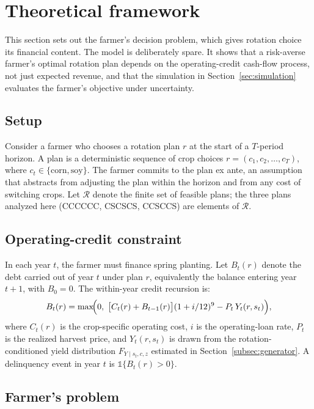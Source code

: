 \documentclass[11pt,letterpaper]{article}
\theoremstyle{remark}
\begin{document}
\section{\label{sec:theory}Theoretical framework}
 
This section sets out the farmer's decision problem, which gives rotation choice its financial content. The model is deliberately spare. It shows that a risk-averse farmer's optimal rotation plan depends on the operating-credit cash-flow process, not just expected revenue, and that the simulation in Section~\ref{sec:simulation} evaluates the farmer's objective under uncertainty.
 
\subsection{\label{subsec:setup}Setup}
 
Consider a farmer who chooses a rotation plan $r$ at the start of a $T$-period horizon. A plan is a deterministic sequence of crop choices $r = (c_1, c_2, \ldots, c_T)$, where $c_t \in \{\text{corn}, \text{soy}\}$. The farmer commits to the plan ex ante, an assumption that abstracts from adjusting the plan within the horizon and from any cost of switching crops. Let $\mathcal{R}$ denote the finite set of feasible plans; the three plans analyzed here (CCCCCC, CSCSCS, CCSCCS) are elements of $\mathcal{R}$.
 
\subsection{\label{subsec:constraint}Operating-credit constraint}
 
In each year $t$, the farmer must finance spring planting. Let $B_t(r)$ denote the debt carried out of year $t$ under plan $r$, equivalently the balance entering year $t+1$, with $B_0 = 0$. The within-year credit recursion is:
\begin{equation}
B_t(r) = \max\!\Bigl(0,\;\bigl[C_t(r) + B_{t-1}(r)\bigr](1+i/12)^{9}
- P_t\,Y_t(r, s_t)\Bigr),
\end{equation}
where $C_t(r)$ is the crop-specific operating cost, $i$ is the operating-loan rate, $P_t$ is the realized harvest price, and $Y_t(r, s_t)$ is drawn from the rotation-conditioned yield distribution $F_{Y \mid s_t, c, z}$ estimated in Section~\ref{subsec:generator}. A delinquency event in year $t$ is $\mathbb{1}\{B_t(r) > 0\}$.
 
\subsection{\label{subsec:farmer_problem}Farmer's problem}
 
\end{document}
